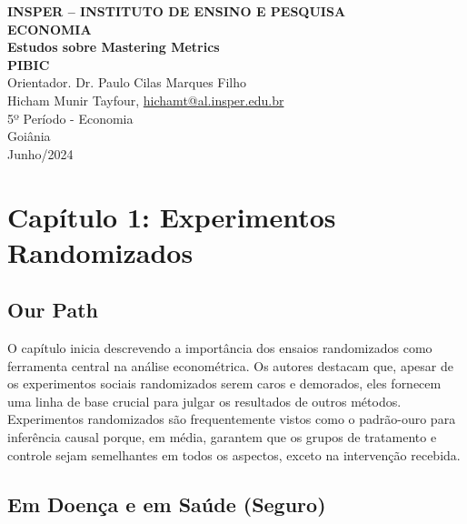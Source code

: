 \documentclass[a4paper,12pt]{article}[abntex2]
\begin{document}
\begin{titlepage}
    \centering
    \vspace*{1cm}
    \Large\textbf{INSPER – INSTITUTO DE ENSINO E PESQUISA}\\
    \Large \textbf{ECONOMIA}\\
    \vspace{1.5cm}
    \Large\textbf{Estudos sobre Mastering Metrics}\\
    \textbf{PIBIC}\\
    \vspace{1.5cm}
    Orientador. Dr. Paulo Cilas Marques Filho\\
    \vfill
    \normalsize
    Hicham Munir Tayfour, \href{mailto:hichamt@al.insper.edu.br}{hichamt@al.insper.edu.br}\\
    5º Período - Economia\\
    \vfill
    Goiânia\\
    Junho/2024
\end{titlepage}

\newpage
\tableofcontents
\thispagestyle{empty} %
\newpage
\setcounter{page}{1} %
\justify
\onehalfspacing

\pagestyle{fancy}
\fancyhf{}
\rhead{\thepage}

\section{Capítulo 1: Experimentos Randomizados}

\subsection*{Our Path}

O capítulo inicia descrevendo a importância dos ensaios randomizados como ferramenta central na análise econométrica. Os autores destacam que, apesar de os experimentos sociais randomizados serem caros e demorados, eles fornecem uma linha de base crucial para julgar os resultados de outros métodos. Experimentos randomizados são frequentemente vistos como o padrão-ouro para inferência causal porque, em média, garantem que os grupos de tratamento e controle sejam semelhantes em todos os aspectos, exceto na intervenção recebida.

\subsection{Em Doença e em Saúde (Seguro)}
\end{document}
